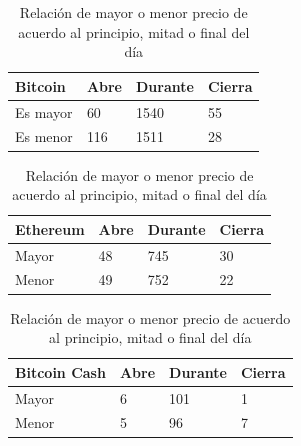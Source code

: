 \documentclass[12pt,letterpaper]{article}
\begin{document}
    \begin{table}[h]
    \centering
    \caption{Relaci\'on de mayor o menor precio de acuerdo al principio, mitad o final del d\'ia}
    \label{label4}
    \begin{tabular}{|l|l|l|l|}
    \hline
    \rowcolor[HTML]{FFFFFF} 
    {\color[HTML]{333333} Bitcoin} & {\color[HTML]{333333} Abre} & {\color[HTML]{333333} Durante} & {\color[HTML]{333333} Cierra} \\ \hline
    Es mayor                       & 60                          & 1540                           & 55                            \\ \hline
    Es menor                       & 116                         & 1511                           & 28                            \\ \hline
    \end{tabular}
    \end{table}

    \begin{table}[h]
    \centering
    \caption{Relaci\'on de mayor o menor precio de acuerdo al principio, mitad o final del d\'ia}
    \label{label5}
    \begin{tabular}{|l|l|l|l|}
    \hline
    \rowcolor[HTML]{FFFFFF} 
    {\color[HTML]{333333} Ethereum} & {\color[HTML]{333333} Abre} & {\color[HTML]{333333} Durante} & {\color[HTML]{333333} Cierra} \\ \hline
    Mayor                           & 48                          & 745                            & 30                            \\ \hline
    Menor                           & 49                          & 752                            & 22                            \\ \hline
    \end{tabular}
    \end{table}

    \begin{table}[h]
    \centering
    \caption{Relaci\'on de mayor o menor precio de acuerdo al principio, mitad o final del d\'ia}
    \label{label6}
    \begin{tabular}{|l|l|l|l|}
    \hline
    \rowcolor[HTML]{FFFFFF}
    {\color[HTML]{333333} Bitcoin Cash} & {\color[HTML]{333333} Abre} & {\color[HTML]{333333} Durante} & {\color[HTML]{333333} Cierra} \\ \hline
    Mayor                               & 6                           & 101                            & 1                             \\ \hline
    Menor                               & 5                           & 96                             & 7                             \\ \hline
    \end{tabular}
    \end{table}
\end{document}
